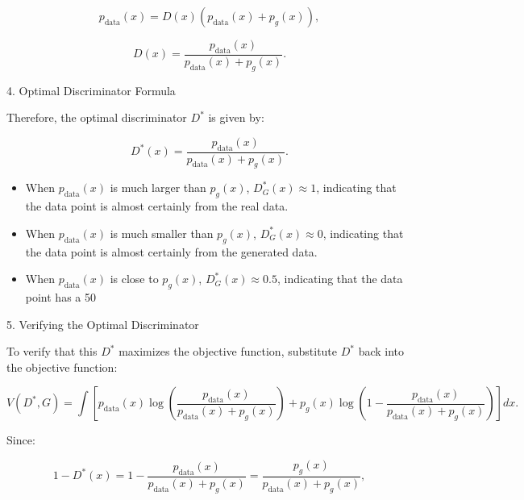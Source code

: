 \begin{equation}
    p_{\text{data}}(x) = D(x)(p_{\text{data}}(x) + p_g(x)),
\end{equation}

\begin{equation}
    D(x) = \frac{p_{\text{data}}(x)}{p_{\text{data}}(x) + p_g(x)}.
\end{equation}

4. Optimal Discriminator Formula

Therefore, the optimal discriminator \( D^* \) is given by:

\begin{equation}
    D^*(x) = \frac{p_{\text{data}}(x)}{p_{\text{data}}(x) + p_g(x)}.
\end{equation}


\begin{itemize}
    \item When \(p_{\text{data}}(x)\) is much larger than \(p_g(x)\), \(D^*_G(x) \approx 1\), indicating 
    that the data point is almost certainly from the real data.
    \item When \(p_{\text{data}}(x)\) is much smaller than \(p_g(x)\), \(D^*_G(x) \approx 0\), indicating 
    that the data point is almost certainly from the generated data.
    \item When \(p_{\text{data}}(x)\) is close to \(p_g(x)\), \(D^*_G(x) \approx 0.5\), indicating that the 
    data point has a 50%
\end{itemize}


5. Verifying the Optimal Discriminator

To verify that this \( D^* \) maximizes the objective function, substitute \( D^* \) back into the objective function:

\begin{equation}
    V(D^*, G) = \int \left[ p_{\text{data}}(x) \log \left( \frac{p_{\text{data}}(x)}{p_{\text{data}}(x) + p_g(x)} \right) + p_g(x) \log \left( 1 - \frac{p_{\text{data}}(x)}{p_{\text{data}}(x) + p_g(x)} \right) \right] dx.
\end{equation}

Since:

\begin{equation}
    1 - D^*(x) = 1 - \frac{p_{\text{data}}(x)}{p_{\text{data}}(x) + p_g(x)} = \frac{p_g(x)}{p_{\text{data}}(x) + p_g(x)},
\end{equation}

